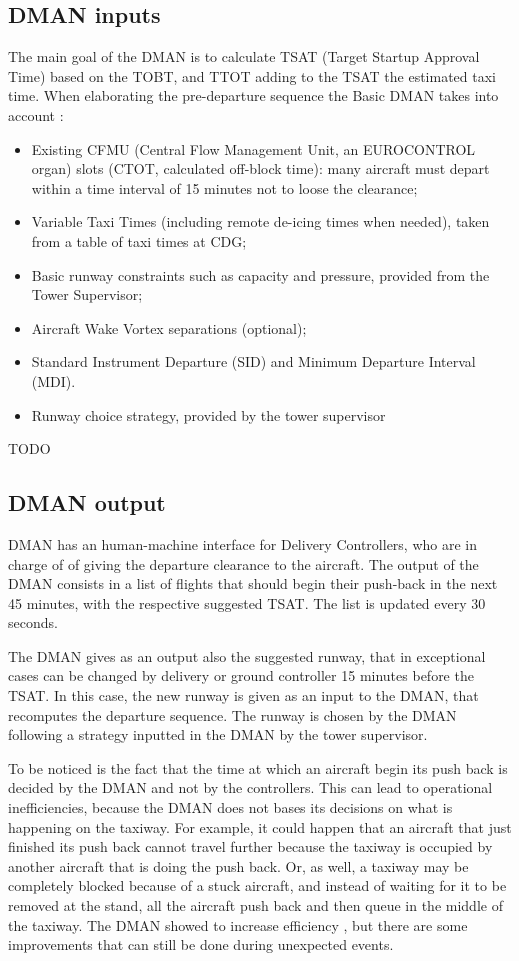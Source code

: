 \documentclass{article}
\begin{document}
\subsection{DMAN inputs}
The main goal of the DMAN is to calculate TSAT (Target Startup Approval Time) based on the TOBT, and TTOT adding to the TSAT the estimated taxi time. 
When elaborating the pre-departure sequence the Basic DMAN takes into account \cite{DMAN}:
\begin{itemize}
\item Existing CFMU (Central Flow Management Unit, an EUROCONTROL organ) slots (CTOT, calculated off-block time): many aircraft must depart within a time interval of 15 minutes not to loose the clearance;
\item Variable Taxi Times (including remote de-icing times when needed), taken from a table of taxi times at CDG;
\item Basic runway constraints such as capacity and pressure, provided from the Tower Supervisor;
\item Aircraft Wake Vortex separations (optional);
\item Standard Instrument Departure (SID) and Minimum Departure Interval (MDI).
\item Runway choice strategy, provided by the tower supervisor
\end{itemize}

TODO

\subsection{DMAN output}

DMAN has an human-machine interface for Delivery Controllers, who are in charge of  of giving the departure clearance to the aircraft. The output of the DMAN consists in a list of flights that should begin their push-back in the next 45 minutes, with the respective suggested TSAT. The list is updated every 30 seconds.


The DMAN gives as an output also the suggested runway, that in exceptional cases can be changed by delivery or ground controller 15 minutes before the TSAT. In this case, the new runway is given as an input to the DMAN, that recomputes the departure sequence. 
The runway is chosen by the DMAN following a strategy inputted in the DMAN by the tower supervisor.

To be noticed is the fact that the time at which an aircraft begin its push back is decided by the DMAN and not by the controllers. This can lead to operational inefficiencies, because the DMAN does not bases its decisions on what is happening on the taxiway. For example, it could happen that an aircraft that just finished its push back cannot travel further because the taxiway is occupied by another aircraft that is doing the push back. Or, as well, a taxiway may be completely blocked because of a stuck aircraft, and instead of waiting for it to be removed at the stand, all the aircraft push back and then queue in the middle of the taxiway. The DMAN showed to increase efficiency \cite{manual}, but there are some improvements that can still be done during unexpected events.
\end{document}
